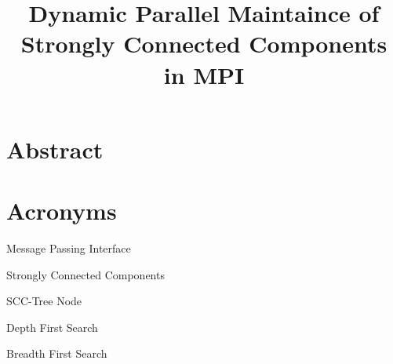 \documentclass{article}
\begin{document}
\title{Dynamic Parallel Maintaince of Strongly Connected Components in MPI}
\submitdate{\today}
\maketitle

\addtocounter{page}{-1}
\thispagestyle{empty}

\newpage
\null\vspace{2in}
\section*{Abstract}

\vspace{\fill}
\thispagestyle{empty}


\newpage
\doublespacing
\tableofcontents
\singlespacing


\newpage

\section*{Acronyms}\label{Acronyms}
\begin{description}[style=unboxed,font=\small]
    \item[MPI:]\label{mpi} Message Passing Interface
    \item[SCC:]\label{scc} Strongly Connected Components
    \item[STN:]\label{stn} SCC-Tree Node
    \item[DFS:]\label{dfs} Depth First Search
    \item[BFS:]\label{bfs} Breadth First Search
  \end{description}
\vspace{2em}
\end{document}
